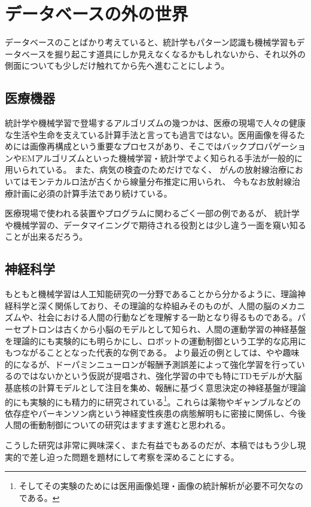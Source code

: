 \section{データベースの外の世界}
データベースのことばかり考えていると、統計学もパターン認識も機械学習もデータベースを掘り起こす道具にしか見えなくなるかもしれないから、それ以外の側面についても少しだけ触れてから先へ進むことにしよう。
\subsection{医療機器}
統計学や機械学習で登場するアルゴリズムの幾つかは、医療の現場で人々の健康な生活や生命を支えている計算手法と言っても過言ではない。医用画像を得るためには画像再構成という重要なプロセスがあり、そこではバックプロパゲーションやEMアルゴリズムといった機械学習・統計学でよく知られる手法が一般的に用いられている。
また、病気の検査のためだけでなく、
がんの放射線治療においてはモンテカルロ法が古くから線量分布推定に用いられ、
今もなお放射線治療計画に必須の計算手法であり続けている。

医療現場で使われる装置やプログラムに関わるごく一部の例であるが、
統計学や機械学習の、データマイニングで期待される役割とは少し違う一面を窺い知ることが出来るだろう。

\subsection{神経科学}
もともと機械学習は人工知能研究の一分野であることから分かるように、理論神経科学と深く関係しており、その理論的な枠組みそのものが、人間の脳のメカニズムや、社会における人間の行動などを理解する一助となり得るものである。パーセプトロンは古くから小脳のモデルとして知られ、人間の運動学習の神経基盤を理論的にも実験的にも明らかにし、ロボットの運動制御という工学的な応用にもつながることとなった代表的な例である。
より最近の例としては、やや趣味的になるが、ドーパミンニューロンが報酬予測誤差によって強化学習を行っているのではないかという仮説が提唱され、強化学習の中でも特にTDモデルが大脳基底核の計算モデルとして注目を集め、報酬に基づく意思決定の神経基盤が理論的にも実験的にも精力的に研究されている\footnote{そしてその実験のためには医用画像処理・画像の統計解析が必要不可欠なのである。}。これらは薬物やギャンブルなどの依存症やパーキンソン病という神経変性疾患の病態解明もに密接に関係し、今後人間の衝動制御についての研究はますます進むと思われる。

こうした研究は非常に興味深く、また有益でもあるのだが、本稿ではもう少し現実的で差し迫った問題を題材にして考察を深めることにする。

